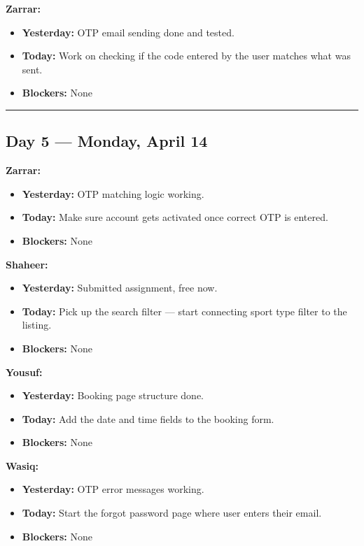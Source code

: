 \documentclass[12pt,a4paper]{article}
\begin{document}
\textbf{Zarrar:}
\begin{itemize}[noitemsep]
    \item \textbf{Yesterday:} OTP email sending done and tested.
    \item \textbf{Today:} Work on checking if the code entered by the user matches what was sent.
    \item \textbf{Blockers:} None
\end{itemize}

\vspace{1em}\hrule\vspace{1em}

\newpage

\subsection*{Day 5 --- Monday, April 14}

\textbf{Zarrar:}
\begin{itemize}[noitemsep]
    \item \textbf{Yesterday:} OTP matching logic working.
    \item \textbf{Today:} Make sure account gets activated once correct OTP is entered.
    \item \textbf{Blockers:} None
\end{itemize}

\textbf{Shaheer:}
\begin{itemize}[noitemsep]
    \item \textbf{Yesterday:} Submitted assignment, free now.
    \item \textbf{Today:} Pick up the search filter --- start connecting sport type filter to the listing.
    \item \textbf{Blockers:} None
\end{itemize}

\textbf{Yousuf:}
\begin{itemize}[noitemsep]
    \item \textbf{Yesterday:} Booking page structure done.
    \item \textbf{Today:} Add the date and time fields to the booking form.
    \item \textbf{Blockers:} None
\end{itemize}

\textbf{Wasiq:}
\begin{itemize}[noitemsep]
    \item \textbf{Yesterday:} OTP error messages working.
    \item \textbf{Today:} Start the forgot password page where user enters their email.
    \item \textbf{Blockers:} None
\end{itemize}
\end{document}
